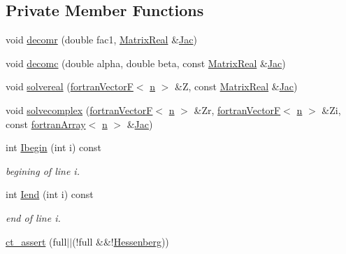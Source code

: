 \subsection*{Private Member Functions}
\begin{DoxyCompactItemize}
\item 
void \hyperlink{classodes_1_1Matrices_a8dc1bc6d92d06af08d4bf8fb2b357a7d}{decomr} (double fac1, \hyperlink{classodes_1_1Radau5cc_a8ef067b8852403d48d8528f601a4626a}{Matrix\-Real} \&\hyperlink{classodes_1_1Radau5cc_a67b952c35d2c7ecddc9dd75cb2c3afe1}{Jac})
\item 
void \hyperlink{classodes_1_1Matrices_a9f497885fb6dd9bb22179fab49d9b587}{decomc} (double alpha, double beta, const \hyperlink{classodes_1_1Radau5cc_a8ef067b8852403d48d8528f601a4626a}{Matrix\-Real} \&\hyperlink{classodes_1_1Radau5cc_a67b952c35d2c7ecddc9dd75cb2c3afe1}{Jac})
\item 
void \hyperlink{classodes_1_1Matrices_ace113b7bfa2377d513c2faaf645aecaa}{solvereal} (\hyperlink{classodes_1_1fortranVectorF}{fortran\-Vector\-F}$<$ \hyperlink{classodes_1_1Radau5cc_a3be3f05d2cdf7268e7d09b62ad9ad494}{n} $>$ \&Z, const \hyperlink{classodes_1_1Radau5cc_a8ef067b8852403d48d8528f601a4626a}{Matrix\-Real} \&\hyperlink{classodes_1_1Radau5cc_a67b952c35d2c7ecddc9dd75cb2c3afe1}{Jac})
\item 
void \hyperlink{classodes_1_1Matrices_abce8558c305de75740568ec55e49338e}{solvecomplex} (\hyperlink{classodes_1_1fortranVectorF}{fortran\-Vector\-F}$<$ \hyperlink{classodes_1_1Radau5cc_a3be3f05d2cdf7268e7d09b62ad9ad494}{n} $>$ \&Zr, \hyperlink{classodes_1_1fortranVectorF}{fortran\-Vector\-F}$<$ \hyperlink{classodes_1_1Radau5cc_a3be3f05d2cdf7268e7d09b62ad9ad494}{n} $>$ \&Zi, const \hyperlink{classodes_1_1fortranArray}{fortran\-Array}$<$ \hyperlink{classodes_1_1Radau5cc_a3be3f05d2cdf7268e7d09b62ad9ad494}{n} $>$ \&\hyperlink{classodes_1_1Radau5cc_a67b952c35d2c7ecddc9dd75cb2c3afe1}{Jac})
\item 
int \hyperlink{classodes_1_1Matrices_a9eb26d713d3e391f60d83798337d87a6}{Ibegin} (int i) const
\begin{DoxyCompactList}\small\item\em begining of line i. \end{DoxyCompactList}\item 
int \hyperlink{classodes_1_1Matrices_a589402cfa0e11666cd152a06e048c6f7}{Iend} (int i) const
\begin{DoxyCompactList}\small\item\em end of line i. \end{DoxyCompactList}\item 
\hyperlink{structcompat_afed990d40241e2a95d09e2ac8ac20cb4}{ct\-\_\-assert} (full$\vert$$\vert$(!full \&\&!\hyperlink{classodes_1_1Radau5cc_ae66683695f55d21d7c11ca7e3323d0e9}{Hessenberg}))
\end{DoxyCompactItemize}
